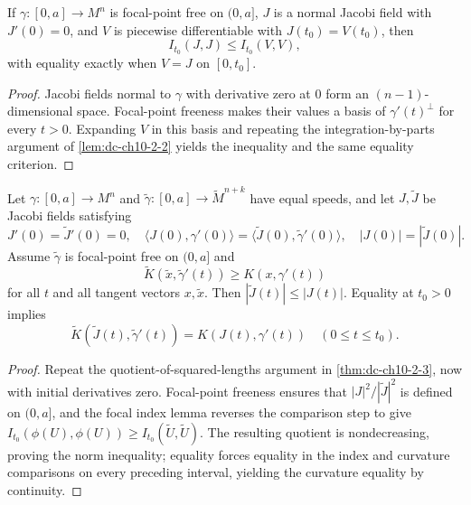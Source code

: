 \begin{lemma}
  \label{lem:dc-ch10-4-8}
  If $\gamma:[0,a]\to M^n$ is focal-point free on $(0,a]$, $J$ is a normal Jacobi
  field with $J'(0)=0$, and $V$ is piecewise differentiable with
  $J(t_0)=V(t_0)$, then
  \[
  I_{t_0}(J,J)\leq I_{t_0}(V,V),
  \]
  with equality exactly when $V=J$ on $[0,t_0]$.
\end{lemma}
\begin{proof}
  \sketch
  Jacobi fields normal to $\gamma$ with derivative zero at $0$ form an
  $(n-1)$-dimensional space. Focal-point freeness makes their values a basis of
  $\gamma'(t)^\perp$ for every $t>0$. Expanding $V$ in this basis and repeating the
  integration-by-parts argument of \cref{lem:dc-ch10-2-2} yields the inequality and
  the same equality criterion.
\end{proof}

\begin{theorem}
  \label{thm:dc-ch10-4-9}
  Let $\gamma:[0,a]\to M^n$ and $\tilde\gamma:[0,a]\to\widetilde M^{n+k}$ have
  equal speeds, and let $J,\tilde J$ be Jacobi fields satisfying
  \[
  J'(0)=\tilde J'(0)=0,\quad
  \langle J(0),\gamma'(0)\rangle=\langle\tilde J(0),\tilde\gamma'(0)\rangle,
  \quad |J(0)|=|\tilde J(0)|.
  \]
  Assume $\tilde\gamma$ is focal-point free on $(0,a]$ and
  \[
  \widetilde K(\tilde x,\tilde\gamma'(t))\geq K(x,\gamma'(t))
  \]
  for all $t$ and all tangent vectors $x,\tilde x$. Then
  $|\tilde J(t)|\leq|J(t)|$. Equality at $t_0>0$ implies
  \[
  \widetilde K(\tilde J(t),\tilde\gamma'(t))=K(J(t),\gamma'(t))
  \quad(0\leq t\leq t_0).
  \]
\end{theorem}
\begin{proof}
  \sketch
  Repeat the quotient-of-squared-lengths argument in
  \cref{thm:dc-ch10-2-3}, now with initial derivatives zero. Focal-point freeness
  ensures that $|J|^2/|\tilde J|^2$ is defined on $(0,a]$, and the focal index lemma
  reverses the comparison step to give
  $I_{t_0}(\phi(U),\phi(U))\geq I_{t_0}(\tilde U,\tilde U)$. The resulting quotient is
  nondecreasing, proving the norm inequality; equality forces equality in the index
  and curvature comparisons on every preceding interval, yielding the curvature
  equality by continuity.
\end{proof}
